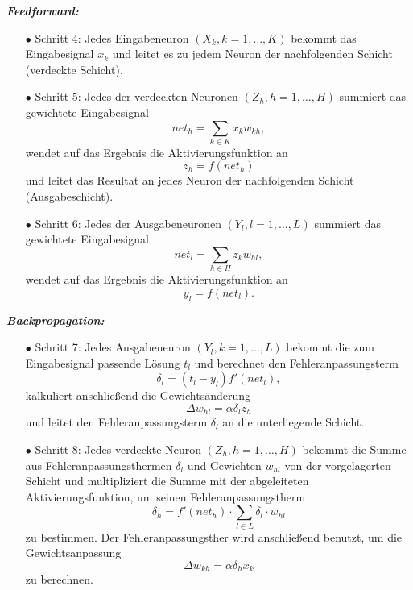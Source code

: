 \textbf{\textit{Feedforward:}}
\begin{itemize}
\item[\textbf{$\bullet$}] Schritt 4: Jedes Eingabeneuron $(X_{k}, k=1,\dots,K)$ bekommt das Eingabesignal $x_{k}$ und leitet es zu jedem Neuron der nachfolgenden Schicht (verdeckte Schicht).

\item[\textbf{$\bullet$}] Schritt 5: Jedes der verdeckten Neuronen $(Z_{h}, h=1,\dots,H)$ summiert das gewichtete Eingabesignal
\begin{equation*}
net_{h}=\sum\limits_{k \in K} x_{k}w_{kh},
\end{equation*}
wendet auf das Ergebnis die Aktivierungsfunktion an 
\begin{equation*}
z_{h}=f(net_{h})
\end{equation*}
und leitet das Resultat an jedes Neuron der nachfolgenden Schicht (Ausgabeschicht).

\item[\textbf{$\bullet$}] Schritt 6: Jedes der Ausgabeneuronen $(Y_{l}, l=1,\dots,L)$ summiert das gewichtete Eingabesignal 
\begin{equation*}
net_{l}=\sum\limits_{h \in H} z_{k}w_{hl},
\end{equation*}
wendet auf das Ergebnis die Aktivierungsfunktion an 
\begin{equation*}
y_{l}=f(net_{l}).
\end{equation*}
\end{itemize}

\textbf{\textit{Backpropagation:}}
\begin{itemize}
\item[\textbf{$\bullet$}] Schritt 7: Jedes Ausgabeneuron $(Y_{l}, k=1,\dots,L)$ bekommt die zum Eingabesignal passende Lösung $t_{l}$ und berechnet den Fehleranpassungsterm 
\begin{equation*}
\delta_{l}=(t_{l}-y_{l})f'(net_{l}),
\end{equation*}
kalkuliert anschließend die Gewichtsänderung 
\begin{equation*}
\Delta w_{hl}=\alpha \delta_{l} z_{h}
\end{equation*}
und leitet den Fehleranpassungsterm $\delta_{l}$ an die unterliegende Schicht.

\item[\textbf{$\bullet$}] Schritt 8: Jedes verdeckte Neuron $(Z_{h}, h=1,\dots,H)$ bekommt die Summe aus Fehleranpassungsthermen $\delta_l$ und Gewichten $w_{hl}$ von der vorgelagerten Schicht und multipliziert die Summe mit der abgeleiteten Aktivierungsfunktion, um seinen Fehleranpassungstherm 
\begin{equation*}
\delta_{h}=f'(net_{h}) \cdot \sum\limits_{l \in L} \delta_{l} \cdot w_{hl}
\end{equation*}
zu bestimmen. Der Fehleranpassungsther wird anschließend benutzt, um die Gewichtsanpassung 
\begin{equation*}
\Delta w_{kh}=\alpha \delta_{h} x_{k}
\end{equation*}
zu berechnen.
\end{itemize}

